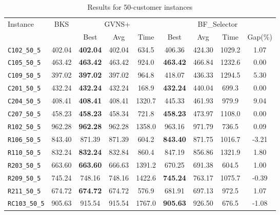 \begin{table}[ht]
\centering
\small
\setlength{\tabcolsep}{5pt}
\caption{Results for 50-customer instances}
\vspace{4mm}
\begin{adjustbox}{width=\textwidth}
\begin{tabular}{l c c c c @{\hspace{8pt}} c c c c @{\hspace{8pt}}}
\toprule
\multirow{2}{*}{Instance} & \multirow{2}{*}{BKS} & \multicolumn{3}{c}{GVNS+} & \multicolumn{4}{c}{BF\_Selector} \\
\cmidrule(lr){3-5} \cmidrule(lr){6-9}
 &  & Best & Avg & Time & Best & Avg & Time & Gap(\%) \\
\midrule
\texttt{C102\_50\_5} & 402.04 & \textbf{402.04} & 402.04 & 634.5 & 406.36 & 424.30 & 1029.2 & 1.07 \\
\texttt{C105\_50\_5} & 463.42 & \textbf{463.42} & 463.42 & 924.0 & \textbf{463.42} & 466.84 & 1232.6 & 0.00 \\
\texttt{C109\_50\_5} & 397.02 & \textbf{397.02} & 397.02 & 964.8 & 418.07 & 436.33 & 1294.5 & 5.30 \\
\texttt{C201\_50\_5} & 432.24 & \textbf{432.24} & 432.24 & 168.9 & \textbf{432.24} & 440.04 & 699.3 & 0.00 \\
\texttt{C204\_50\_5} & 408.41 & \textbf{408.41} & 408.41 & 1320.7 & 445.33 & 461.93 & 979.9 & 9.04 \\
\texttt{C207\_50\_5} & 458.23 & \textbf{458.23} & 458.34 & 721.8 & \textbf{458.23} & 473.97 & 1108.0 & 0.00 \\
\texttt{R102\_50\_5} & 962.28 & \textbf{962.28} & 962.28 & 1358.0 & 963.16 & 971.79 & 736.5 & 0.09 \\
\texttt{R106\_50\_5} & 843.40 & 871.39 & 871.39 & 604.2 & \textbf{843.40} & 871.75 & 1016.7 & -3.21 \\
\texttt{R110\_50\_5} & 832.24 & \textbf{832.24} & 832.84 & 860.4 & 847.19 & 856.86 & 1321.9 & 1.80 \\
\texttt{R203\_50\_5} & 663.60 & \textbf{663.60} & 666.63 & 1391.2 & 670.25 & 691.38 & 604.5 & 1.00 \\
\texttt{R209\_50\_5} & 745.24 & 748.16 & 748.16 & 1422.6 & \textbf{745.24} & 763.17 & 1075.7 & -0.39 \\
\texttt{R211\_50\_5} & 674.72 & \textbf{674.72} & 674.72 & 576.9 & 681.91 & 697.13 & 972.5 & 1.07 \\
\texttt{RC103\_50\_5} & 905.63 & 915.54 & 915.54 & 1767.0 & \textbf{905.63} & 926.50 & 676.5 & -1.08 \\

\end{tabular}
\end{adjustbox}
\end{table}
